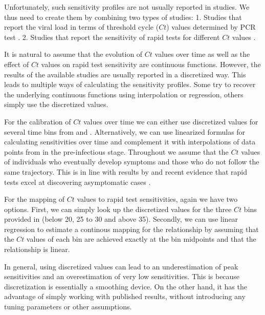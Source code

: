 {    %
    Unfortunately, such sensitivity profiles are not usually reported in studies. We
    thus need to create them by combining two types of studies: 1. Studies that report
    the viral load in terms of threshold cycle ($Ct$) values determined by PCR test
    \citep[e.g.][]{Cosentino2022,Ong2021,Bonnet2022,Jang2021,Zuin2021}. 2. Studies that
    report the sensitivity of rapid tests for different $Ct$ values
    \citep[e.g.][]{Scheiblauer2021,Bruemmer2021}.

    It is natural to assume that the evolution of $Ct$ values over time as well as the
    effect of $Ct$ values on rapid test sensitivity are continuous functions. However,
    the results of the available studies are usually reported in a discretized way. This
    leads to multiple ways of calculating the sensitivity profiles. Some try to recover
    the underlying continuous functions using interpolation or regression, others simply
    use the discretized values.

    For the calibration of $Ct$ values over time we can either use discretized values
    for several time bins from \cite{Ong2021} and \cite{Jang2021}. Alternatively, we can
    use linearized formulas for calculating sensitivities over time \cite{Cosentino2022}
    and complement it with interpolations of data points from \cite{Jang2021} in the
    pre-infectious stage. Throughout we assume that the $Ct$ values of individuals who
    eventually develop symptoms and those who do not follow the same trajectory. This is
    in line with results by \cite{Zuin2021} and recent evidence that rapid tests excel
    at discovering asymptomatic cases \cite{Rosella2022}.

    For the mapping of $Ct$ values to rapid test sensitivities, again we have two
    options. First, we can simply look up the discretized values for the three $Ct$ bins
    provided in \cite{Scheiblauer2021} (below 20, 25 to 30 and above 35). Secondly, we
    can use linear regression to estimate a continous mapping for the relationship by
    assuming that the $Ct$ values of each bin are achieved exactly at the bin midpoints
    and that the relationship is linear.

    In general, using discretized values can lead to an underestimation of peak
    sensitivities and an overestimation of very low sensitivities. This is because
    discretization is essentially a smoothing device. On the other hand, it has the
    advantage of simply working with published results, without introducing any tuning
    parameters or other assumptions.

}
